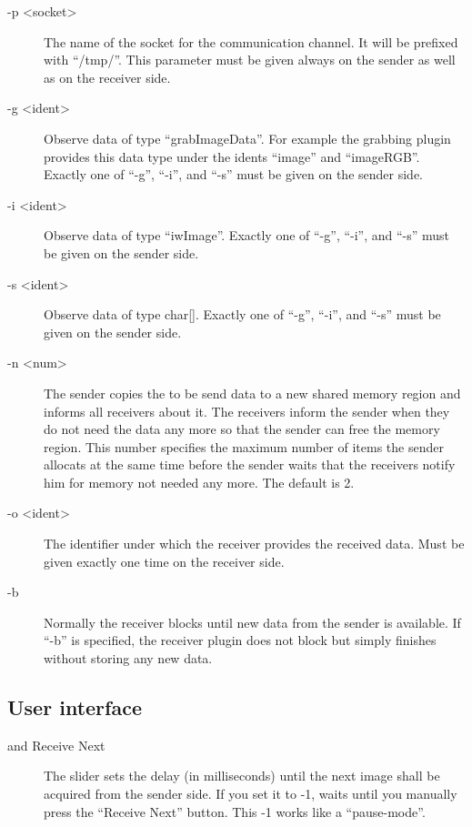 \begin{description}
\item[-p \textless{}socket\textgreater{}]
  The name of the socket for the communication channel. It will be
  prefixed with ``/tmp/''. This parameter must be given always on
  the sender as well as on the receiver side.
\item[-g \textless{}ident\textgreater{}]
  Observe data of type ``grabImageData''. For example the grabbing
  plugin provides this data type under the idents ``image'' and
  ``imageRGB''. Exactly one of ``-g'', ``-i'', and ``-s'' must be
  given on the sender side.
\item[-i \textless{}ident\textgreater{}]
  Observe data of type ``iwImage''. Exactly one of ``-g'', ``-i'',
  and ``-s'' must be given on the sender side.
\item[-s \textless{}ident\textgreater{}]
  Observe data of type char[]. Exactly one of ``-g'', ``-i'', and
  ``-s'' must be given on the sender side.
\item[-n \textless{}num\textgreater{}]
  The sender copies the to be send data to a new shared memory
  region and informs all receivers about it. The receivers inform
  the sender when they do not need the data any more so that the
  sender can free the memory region. This number specifies the
  maximum number of items the sender allocats at the same time
  before the sender waits that the receivers notify him for memory
  not needed any more. The default is 2.
\item[-o \textless{}ident\textgreater{}]
  The identifier under which the receiver provides the received
  data. Must be given exactly one time on the receiver side.
\item[-b]
  Normally the receiver blocks until new data from the sender is
  available. If ``-b'' is specified, the receiver plugin does not
  block but simply finishes without storing any new data.
\end{description}

\subsection{User interface}

\begin{description}
\item[ and Receive Next]
  The slider sets the delay (in milliseconds) until the next image
  shall be acquired from the sender side. If you set it to -1,
  \icewing{} waits until you manually press the ``Receive Next''
  button. This -1 works like a ``pause-mode''.
\end{description}

